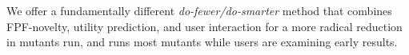 We offer a fundamentally
different \emph{do-fewer/do-smarter} method that combines FPF-novelty, utility
prediction, and user interaction for a more radical reduction in
mutants run, and runs most mutants while users are examining early results.


%

